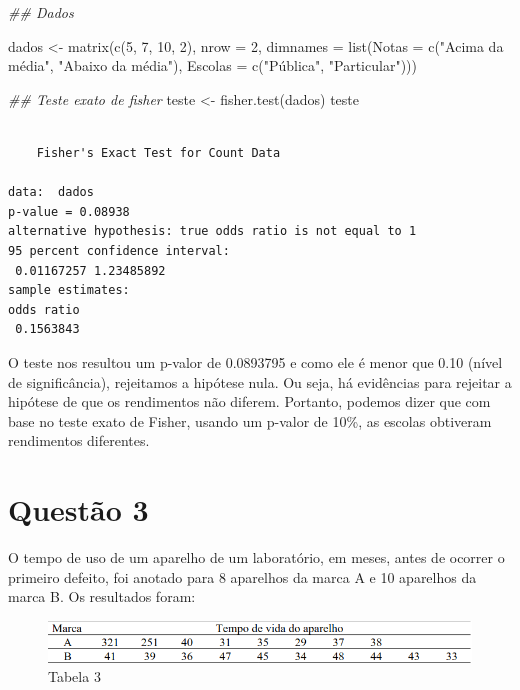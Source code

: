 \documentclass[
  letterpaper,
  DIV=11,
  numbers=noendperiod]{scrartcl}
\newenvironment{Shaded}{\begin{snugshade}}{\end{snugshade}}
\newcommand{\AttributeTok}[1]{\textcolor[rgb]{0.40,0.45,0.13}{#1}}
\newcommand{\DecValTok}[1]{\textcolor[rgb]{0.68,0.00,0.00}{#1}}
\newcommand{\DocumentationTok}[1]{\textcolor[rgb]{0.37,0.37,0.37}{\textit{#1}}}
\newcommand{\FunctionTok}[1]{\textcolor[rgb]{0.28,0.35,0.67}{#1}}
\newcommand{\NormalTok}[1]{\textcolor[rgb]{0.00,0.23,0.31}{#1}}
\newcommand{\OtherTok}[1]{\textcolor[rgb]{0.00,0.23,0.31}{#1}}
\newcommand{\StringTok}[1]{\textcolor[rgb]{0.13,0.47,0.30}{#1}}
\begin{document}
\begin{Shaded}
\begin{Highlighting}[]
\DocumentationTok{\#\# Dados}

\NormalTok{dados  }\OtherTok{\textless{}{-}}
  \FunctionTok{matrix}\NormalTok{(}\FunctionTok{c}\NormalTok{(}\DecValTok{5}\NormalTok{, }\DecValTok{7}\NormalTok{, }\DecValTok{10}\NormalTok{, }\DecValTok{2}\NormalTok{),}
         \AttributeTok{nrow =} \DecValTok{2}\NormalTok{,}
         \AttributeTok{dimnames =} \FunctionTok{list}\NormalTok{(}\AttributeTok{Notas =} \FunctionTok{c}\NormalTok{(}\StringTok{"Acima da média"}\NormalTok{, }\StringTok{"Abaixo da média"}\NormalTok{),}
                         \AttributeTok{Escolas =} \FunctionTok{c}\NormalTok{(}\StringTok{"Pública"}\NormalTok{, }\StringTok{"Particular"}\NormalTok{)))}

\DocumentationTok{\#\# Teste exato de fisher}
\NormalTok{teste }\OtherTok{\textless{}{-}} \FunctionTok{fisher.test}\NormalTok{(dados)}
\NormalTok{teste}
\end{Highlighting}
\end{Shaded}

\begin{verbatim}

    Fisher's Exact Test for Count Data

data:  dados
p-value = 0.08938
alternative hypothesis: true odds ratio is not equal to 1
95 percent confidence interval:
 0.01167257 1.23485892
sample estimates:
odds ratio 
 0.1563843 
\end{verbatim}

O teste nos resultou um p-valor de 0.0893795 e como ele é menor que 0.10
(nível de significância), rejeitamos a hipótese nula. Ou seja, há
evidências para rejeitar a hipótese de que os rendimentos não diferem.
Portanto, podemos dizer que com base no teste exato de Fisher, usando um
p-valor de 10\%, as escolas obtiveram rendimentos diferentes.

\section{Questão 3}\label{questuxe3o-3}

O tempo de uso de um aparelho de um laboratório, em meses, antes de
ocorrer o primeiro defeito, foi anotado para 8 aparelhos da marca A e 10
aparelhos da marca B. Os resultados foram:

\begin{figure}[H]

{\centering \includegraphics{imgs/q3-tabela.png}

}

\caption{Tabela 3}

\end{figure}%
\end{document}

